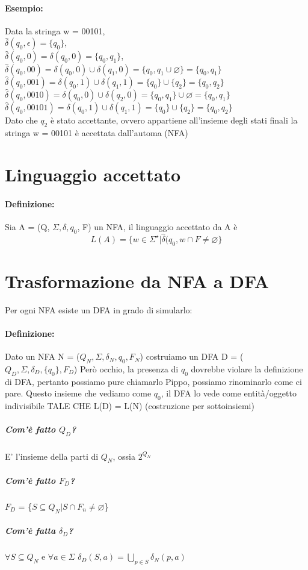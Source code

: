 \documentclass[12pt, a4paper, openany, oneside]{book}
\begin{document}
\paragraph{Esempio: }Data la stringa w = 00101, \\
$\widehat{\delta}(q_{0}, \epsilon) = \{q_{0}\}$, \\
$\widehat{\delta}(q_{0}, 0) = \delta(q_{0},0) = \{q_{0}, q_{1}\}$, \\
$\widehat{\delta}(q_{0}, 00) = \delta(q_{0},0) \cup \delta(q_{1},0) = 
\{q_{0},q_{1}\cup \varnothing\} = \{q_{0},q_{1}\}$\\
$\widehat{\delta}(q_{0}, 001) = \delta(q_{0},1) \cup \delta(q_{1},1) = 
\{q_{0}\} \cup \{q_{2}\} = \{q_{0}, q_{2}\}$ \\
$\widehat{\delta}(q_{0}, 0010) = \delta(q_{0},0) \cup \delta(q_{2},0) =
\{q_{0},q_{1}\}\cup \varnothing = \{q_{0},q_{1}\}$ \\
$\widehat{\delta}(q_{0}, 00101) = \delta(q_{0}, 1) \cup \delta(q_{1},1) =
\{q_{0}\}\cup \{q_{2}\} = \{q_{0}, q_{2}\}$ \\
Dato che $q_{2}$ è stato accettante, ovvero appartiene all'insieme degli stati finali
la stringa w = 00101 è accettata dall'automa (NFA)
\section{Linguaggio accettato}
\paragraph{Definizione: }Sia A = (Q, $\Sigma, \delta, q_{0}$, F) un NFA, il 
linguaggio accettato da A è 
\[
	L(A)=\{w\in \Sigma^{\star} | \widehat{\delta}(q_{0},w \cap F \neq \varnothing\}
\]
\section{Trasformazione da NFA a DFA}
Per ogni NFA esiste un DFA in grado di simularlo:
\paragraph{Definizione: }Dato un NFA N = ($Q_{N}, \Sigma, \delta_{N},q_{0}, F_{N}$)
costruiamo un DFA D = ($Q_{D},\Sigma, \delta_{D},\{q_{0}\}, F_{D}$)
Però occhio, la presenza di $q_{0}$ dovrebbe violare la definizione di DFA, 
pertanto possiamo pure chiamarlo Pippo, possiamo rinominarlo come ci pare. 
Questo insieme che vediamo come $q_{0}$, il DFA lo vede come entità/oggetto 
indivisibile TALE CHE L(D) = L(N) (costruzione per sottoinsiemi) %
\subparagraph{Com'è fatto $Q_{D}$?} E' l'insieme della parti di $Q_{N}$, ossia $2^{Q_{N}}$
\subparagraph{Com'è fatto $F_{D}$?} $F_{D}$ = \{$S \subseteq Q_{N}|S\cap F_{n}\neq 
\varnothing$\}	
\subparagraph{Com'è fatta $\delta_{D}$?} $\forall S \subseteq Q_{N}$ e $\forall a \in \Sigma$
$\delta_{D}(S,a) = \bigcup \limits_{p \in S} \delta_{N}(p,a)$	
\end{document}
